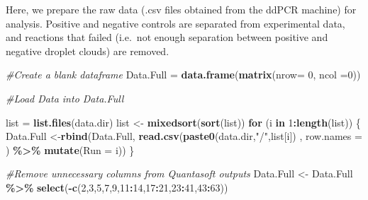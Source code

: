 \documentclass[
]{article}
\newenvironment{Shaded}{\begin{snugshade}}{\end{snugshade}}
\newcommand{\AttributeTok}[1]{\textcolor[rgb]{0.13,0.29,0.53}{#1}}
\newcommand{\CommentTok}[1]{\textcolor[rgb]{0.56,0.35,0.01}{\textit{#1}}}
\newcommand{\ControlFlowTok}[1]{\textcolor[rgb]{0.13,0.29,0.53}{\textbf{#1}}}
\newcommand{\DecValTok}[1]{\textcolor[rgb]{0.00,0.00,0.81}{#1}}
\newcommand{\FunctionTok}[1]{\textcolor[rgb]{0.13,0.29,0.53}{\textbf{#1}}}
\newcommand{\NormalTok}[1]{#1}
\newcommand{\OtherTok}[1]{\textcolor[rgb]{0.56,0.35,0.01}{#1}}
\newcommand{\SpecialCharTok}[1]{\textcolor[rgb]{0.81,0.36,0.00}{\textbf{#1}}}
\newcommand{\StringTok}[1]{\textcolor[rgb]{0.31,0.60,0.02}{#1}}
\begin{document}
Here, we prepare the raw data (.csv files obtained from the ddPCR
machine) for analysis. Positive and negative controls are separated from
experimental data, and reactions that failed (i.e.~not enough separation
between positive and negative droplet clouds) are removed.

\begin{Shaded}
\begin{Highlighting}[]
\CommentTok{\#Create a blank dataframe}
\NormalTok{Data.Full }\OtherTok{=} \FunctionTok{data.frame}\NormalTok{(}\FunctionTok{matrix}\NormalTok{(}\AttributeTok{nrow=} \DecValTok{0}\NormalTok{, }\AttributeTok{ncol =}\DecValTok{0}\NormalTok{))}

\CommentTok{\#Load Data into Data.Full}
 
\NormalTok{list }\OtherTok{=} \FunctionTok{list.files}\NormalTok{(data.dir)}
\NormalTok{list }\OtherTok{\textless{}{-}} \FunctionTok{mixedsort}\NormalTok{(}\FunctionTok{sort}\NormalTok{(list))}
\ControlFlowTok{for}\NormalTok{ (i }\ControlFlowTok{in} \DecValTok{1}\SpecialCharTok{:}\FunctionTok{length}\NormalTok{(list)) \{}
\NormalTok{  Data.Full }\OtherTok{\textless{}{-}}\FunctionTok{rbind}\NormalTok{(Data.Full, }\FunctionTok{read.csv}\NormalTok{(}\FunctionTok{paste0}\NormalTok{(data.dir,}\StringTok{"/"}\NormalTok{,list[i]) , }\AttributeTok{row.names =}\NormalTok{ ) }\SpecialCharTok{\%\textgreater{}\%} \FunctionTok{mutate}\NormalTok{(}\AttributeTok{Run =}\NormalTok{ i))}
\NormalTok{\}}

\CommentTok{\#Remove unnecessary columns from Quantasoft outputs}
\NormalTok{Data.Full }\OtherTok{\textless{}{-}}\NormalTok{ Data.Full }\SpecialCharTok{\%\textgreater{}\%} \FunctionTok{select}\NormalTok{(}\SpecialCharTok{{-}}\FunctionTok{c}\NormalTok{(}\DecValTok{2}\NormalTok{,}\DecValTok{3}\NormalTok{,}\DecValTok{5}\NormalTok{,}\DecValTok{7}\NormalTok{,}\DecValTok{9}\NormalTok{,}\DecValTok{11}\SpecialCharTok{:}\DecValTok{14}\NormalTok{,}\DecValTok{17}\SpecialCharTok{:}\DecValTok{21}\NormalTok{,}\DecValTok{23}\SpecialCharTok{:}\DecValTok{41}\NormalTok{,}\DecValTok{43}\SpecialCharTok{:}\DecValTok{63}\NormalTok{))}


\end{Highlighting}
\end{Shaded}
\end{document}
